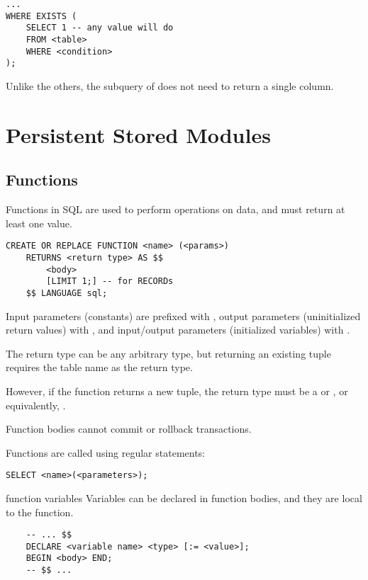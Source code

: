 \begin{lstlisting}
...
WHERE EXISTS (
    SELECT 1 -- any value will do
    FROM <table>
    WHERE <condition>
);
\end{lstlisting}

Unlike the others, the subquery of  does not need to return a single column.

\section{Persistent Stored Modules}
\subsection{Functions}
Functions in SQL are used to perform operations on data, and must return at least one value.

\begin{lstlisting}
CREATE OR REPLACE FUNCTION <name> (<params>)
    RETURNS <return type> AS $$
        <body>
        [LIMIT 1;] -- for RECORDs
    $$ LANGUAGE sql;
\end{lstlisting}

Input parameters (constants) are prefixed with , output parameters (uninitialized return values) with , and input/output parameters (initialized variables) with .

The return type can be any arbitrary type, but returning an existing tuple requires the table name as the return type.

However, if the function returns a new tuple, the return type must be a  or , or equivalently, .

Function bodies cannot commit or rollback transactions.

Functions are called using regular  statements:

\begin{lstlisting}
SELECT <name>(<parameters>);
\end{lstlisting}

\begin{defn}{function variables}
    Variables can be declared in function bodies, and they are local to the function.

    \begin{lstlisting}
    -- ... $$
    DECLARE <variable name> <type> [:= <value>];
    BEGIN <body> END;
    -- $$ ...
\end{lstlisting}
\end{defn}

